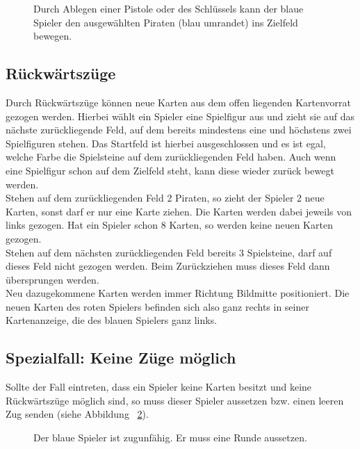 \documentclass[a4paper, ngerman]{scrartcl}
\begin{document}
	\begin{figure}[h]
		\centering
		\caption{Durch Ablegen einer Pistole oder des Schlüssels kann der blaue
		Spieler den ausgewählten Piraten (blau umrandet) ins Zielfeld bewegen.}
		\label{fig:Zielfeld}
	\end{figure}
	 
\subsection{Rückwärtszüge}
Durch Rückwärtszüge können neue Karten aus dem offen liegenden Kartenvorrat
gezogen werden.
Hierbei wählt ein Spieler eine Spielfigur aus und zieht sie auf das nächste
zurückliegende Feld, auf dem bereits mindestens eine und höchstens zwei
Spielfiguren stehen. Das Startfeld ist hierbei ausgeschlossen und es ist egal,
welche Farbe die Spielsteine auf dem zurückliegenden Feld haben. Auch wenn eine
Spielfigur schon auf dem Zielfeld steht, kann diese wieder zurück bewegt
werden.\\
Stehen auf dem zurückliegenden Feld 2 Piraten, so zieht der Spieler 2 neue
Karten, sonst darf er nur eine Karte ziehen. Die Karten werden dabei jeweils von
links gezogen. Hat ein Spieler schon 8 Karten, so werden keine neuen Karten
gezogen.\\
Stehen auf dem nächsten zurückliegenden Feld bereits 3 Spielsteine, darf auf
dieses Feld nicht gezogen werden. Beim Zurückziehen muss dieses Feld dann
übersprungen werden.\\
Neu dazugekommene Karten werden immer
Richtung Bildmitte positioniert. Die neuen Karten des roten Spielers befinden sich also ganz rechts in seiner
Kartenanzeige, die des blauen Spielers ganz links.



\subsection{Spezialfall: Keine Züge möglich}
	
	Sollte der Fall eintreten, dass ein Spieler keine Karten besitzt und keine
	Rückwärtszüge möglich sind, so muss dieser Spieler aussetzen bzw. einen leeren
	Zug senden (siehe Abbildung ~\ref{fig:zugunfaehig}).
	\begin{figure}[h]
	 \centering
	 \caption{Der blaue Spieler ist zugunfähig. Er muss eine Runde aussetzen.}
	 \label{fig:zugunfaehig}
	\end{figure}
	
\end{document}
